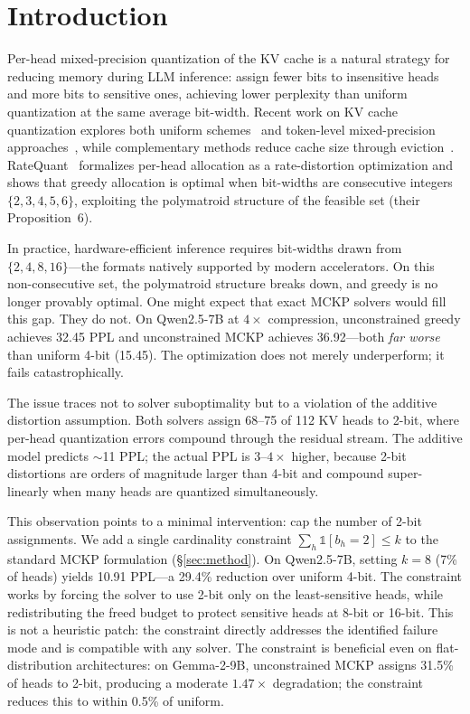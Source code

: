 \section{Introduction}
\label{sec:introduction}

Per-head mixed-precision quantization of the KV cache is a natural strategy for reducing memory during LLM inference: assign fewer bits to insensitive heads and more bits to sensitive ones, achieving lower perplexity than uniform quantization at the same average bit-width.
Recent work on KV cache quantization explores both uniform schemes~\cite{liu2024kivi,hooper2024kvquant,lin2024qserve,he2024zipcache} and token-level mixed-precision approaches~\cite{ge2024fastgen,lei2026arkv}, while complementary methods reduce cache size through eviction~\cite{zhang2023h2o,li2024snapkv}.
RateQuant~\cite{zuo2026ratequant} formalizes per-head allocation as a rate-distortion optimization and shows that greedy allocation is optimal when bit-widths are consecutive integers $\{2,3,4,5,6\}$, exploiting the polymatroid structure of the feasible set (their Proposition~6).

In practice, hardware-efficient inference requires bit-widths drawn from $\{2, 4, 8, 16\}$---the formats natively supported by modern accelerators.
On this non-consecutive set, the polymatroid structure breaks down, and greedy is no longer provably optimal.
One might expect that exact MCKP solvers would fill this gap.
They do not.
On Qwen2.5-7B at $4\times$ compression, unconstrained greedy achieves 32.45 PPL and unconstrained MCKP achieves 36.92---both \emph{far worse} than uniform 4-bit (15.45).
The optimization does not merely underperform; it fails catastrophically.

The issue traces not to solver suboptimality but to a violation of the additive distortion assumption.
Both solvers assign 68--75 of 112 KV heads to 2-bit, where per-head quantization errors compound through the residual stream.
The additive model predicts $\sim$11 PPL; the actual PPL is $3$--$4\times$ higher, because 2-bit distortions are orders of magnitude larger than 4-bit and compound super-linearly when many heads are quantized simultaneously.

This observation points to a minimal intervention: cap the number of 2-bit assignments.
We add a single cardinality constraint $\sum_h \mathbb{1}[b_h{=}2] \leq k$ to the standard MCKP formulation (\S\ref{sec:method}).
On Qwen2.5-7B, setting $k{=}8$ (7\% of heads) yields 10.91 PPL---a 29.4\% reduction over uniform 4-bit.
The constraint works by forcing the solver to use 2-bit only on the least-sensitive heads, while redistributing the freed budget to protect sensitive heads at 8-bit or 16-bit.
This is not a heuristic patch: the constraint directly addresses the identified failure mode and is compatible with any solver.
The constraint is beneficial even on flat-distribution architectures: on Gemma-2-9B, unconstrained MCKP assigns 31.5\% of heads to 2-bit, producing a moderate $1.47\times$ degradation; the constraint reduces this to within 0.5\% of uniform.

